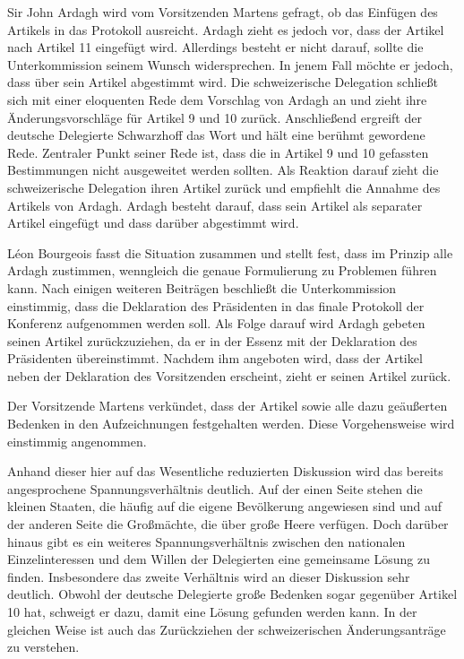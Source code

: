 \documentclass[12pt]{scrartcl}
\begin{document}
Sir John Ardagh wird vom Vorsitzenden Martens gefragt, ob das Einfügen des Artikels in das Protokoll ausreicht. Ardagh zieht es jedoch vor, dass der Artikel nach Artikel 11 eingefügt wird. Allerdings besteht er nicht darauf, sollte die Unterkommission seinem Wunsch widersprechen. In jenem Fall möchte er jedoch, dass über sein Artikel abgestimmt wird. Die schweizerische Delegation schließt sich mit einer eloquenten Rede dem Vorschlag von Ardagh an und zieht ihre Änderungsvorschläge für Artikel 9 und 10 zurück. Anschließend ergreift der deutsche Delegierte Schwarzhoff das Wort und hält eine berühmt gewordene Rede. Zentraler Punkt seiner Rede ist, dass die in Artikel 9 und 10 gefassten Bestimmungen nicht ausgeweitet werden sollten. Als Reaktion darauf zieht die schweizerische Delegation ihren Artikel zurück und empfiehlt die Annahme des Artikels von Ardagh. Ardagh besteht darauf, dass sein Artikel als separater Artikel eingefügt und dass darüber abgestimmt wird.

Léon Bourgeois fasst die Situation zusammen und stellt fest, dass im Prinzip alle Ardagh zustimmen, wenngleich die genaue Formulierung zu Problemen führen kann. Nach einigen weiteren Beiträgen beschließt die Unterkommission einstimmig, dass die Deklaration des Präsidenten in das finale Protokoll der Konferenz aufgenommen werden soll. Als Folge darauf wird Ardagh gebeten seinen Artikel zurückzuziehen, da er in der Essenz mit der Deklaration des Präsidenten übereinstimmt. Nachdem ihm angeboten wird, dass der Artikel neben der Deklaration des Vorsitzenden erscheint, zieht er seinen Artikel zurück. 

Der Vorsitzende Martens verkündet, dass der Artikel sowie alle dazu geäußerten Bedenken in den Aufzeichnungen festgehalten werden. Diese Vorgehensweise wird einstimmig angenommen.

Anhand dieser hier auf das Wesentliche reduzierten Diskussion wird das bereits angesprochene Spannungsverhältnis deutlich. Auf der einen Seite stehen die kleinen Staaten, die häufig auf die eigene Bevölkerung angewiesen sind und auf der anderen Seite die Großmächte, die über große Heere verfügen. Doch darüber hinaus gibt es ein weiteres Spannungsverhältnis zwischen den nationalen Einzelinteressen und dem Willen der Delegierten eine gemeinsame Lösung zu finden. Insbesondere das zweite Verhältnis wird an dieser Diskussion sehr deutlich. Obwohl der deutsche Delegierte große Bedenken sogar gegenüber Artikel 10 hat, schweigt er dazu, damit eine Lösung gefunden werden kann. In der gleichen Weise ist auch das Zurückziehen der schweizerischen Änderungsanträge zu verstehen.
\end{document}
